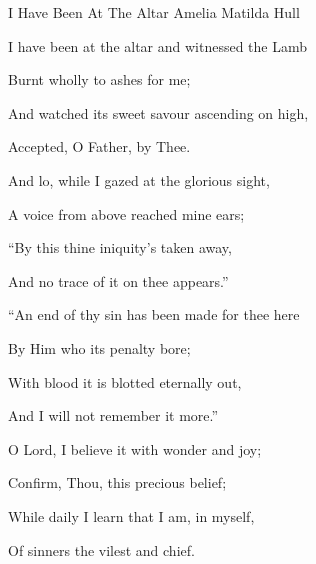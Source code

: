 \documentclass[12pt]{book}
\begin{document}
\begin{song}{I Have Been At The Altar}{}
  {\SBPubDom}
  {Amelia Matilda Hull}
  {}
  {}

  \begin{SBVerse}
    I have been at the altar and witnessed the Lamb

    Burnt wholly to ashes for me;

    And watched its sweet savour ascending on high,

    Accepted, O Father, by Thee.
  \end{SBVerse}

  \begin{SBVerse}
    And lo, while I gazed at the glorious sight,

    A voice from above reached mine ears;

    ``By this thine iniquity's taken away,

    And no trace of it on thee appears.''
  \end{SBVerse}

  \begin{SBVerse}
    ``An end of thy sin has been made for thee here

    By Him who its penalty bore;

    With blood it is blotted eternally out,

    And I will not remember it more.''
  \end{SBVerse}

  \begin{SBVerse}
    O Lord, I believe it with wonder and joy;

    Confirm, Thou, this precious belief;

    While daily I learn that I am, in myself,

    Of sinners the vilest and chief.
  \end{SBVerse}
\end{song}
\end{document}
